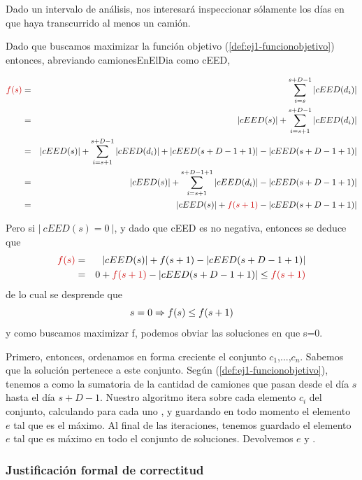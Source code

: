 \documentclass[11pt, a4paper, twoside]{article}
\begin{document}
\begin{proposicion}
Dado un intervalo de análisis, nos interesará inspeccionar sólamente los días
en que haya transcurrido al menos un camión.
\end{proposicion}
\begin{demostracion}
Dado que buscamos maximizar la función objetivo (\ref{def:ej1-funcionobjetivo})
entonces, abreviando camionesEnElDia como cEED,

\begin{eqnarray}
\red{f(s)} &=& \sum_{i=s}^{s+D-1}{|cEED(d_{i})|} \nonumber\\
     &=& |cEED(s)| + \sum_{i=s+1}^{s+D-1}{|cEED(d_{i})|} \nonumber\\
     &=& |cEED(s)| + \sum_{i=s+1}^{s+D-1}{|cEED(d_{i})|} + |cEED(s+D-1+1)| - |cEED(s+D-1+1)| \nonumber\\
     &=& |cEED(s)| + \sum_{i=s+1}^{s+D-1+1}{|cEED(d_{i})|} - |cEED(s+D-1+1)| \nonumber\\
     &=& |cEED(s)| + \red{f(s+1)} - |cEED(s+D-1+1)| \nonumber
\end{eqnarray}

Pero si $|~cEED(s)=0~|$, y dado que cEED es no negativa, entonces se deduce que
\begin{eqnarray}
\red{f(s)} &=& |cEED(s)| + f(s+1) - |cEED(s+D-1+1)| \nonumber \\
     &=& 0 + \red{f(s+1)} - |cEED(s+D-1+1)| \leq \red{f(s+1)} \nonumber
\end{eqnarray}
de lo cual se desprende que 
\[
  s=0 \Rightarrow f(s) \leq f(s+1)
\]
y como buscamos maximizar f, podemos obviar las soluciones en que s=0.
\end{demostracion}




Primero, entonces, ordenamos en forma creciente el conjunto
{$c_1$,...,$c_n$}. Sabemos que la solución pertenece a este conjunto.
Según (\ref{def:ej1-funcionobjetivo}), tenemos a  como la sumatoria 
de la cantidad de camiones que pasan desde el día $s$ hasta el día $s+D-1$. 
Nuestro algoritmo itera sobre cada elemento $c_i$ del conjunto, calculando 
para cada uno , y guardando en todo momento el elemento $e$ tal que 
 es el máximo. Al final de las iteraciones, tenemos guardado el
elemento $e$ tal que  es máximo en todo el conjunto de soluciones. 
Devolvemos $e$ y .


\subsubsection{Justificación formal de correctitud}
\end{document}
